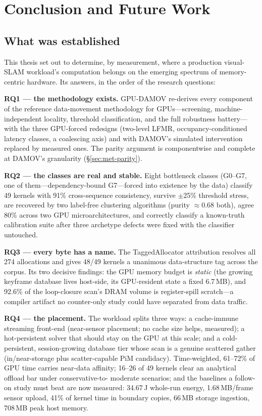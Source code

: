 \chapter{Conclusion and Future Work}
\label{ch:conclusion}

\section{What was established}

This thesis set out to determine, by measurement, where a production
visual-SLAM workload's computation belongs on the emerging spectrum of
memory-centric hardware. Its answers, in the order of the research
questions:

\textbf{RQ1 --- the methodology exists.} GPU-DAMOV re-derives every
component of the reference data-movement methodology for GPUs---screening,
machine-independent locality, threshold classification, and the full
robustness battery---with the three GPU-forced redesigns (two-level LFMR,
occupancy-conditioned latency classes, a coalescing axis) and with DAMOV's
simulated intervention replaced by measured ones. The parity argument is
componentwise and complete at DAMOV's granularity
(\S\ref{sec:met-parity}).

\textbf{RQ2 --- the classes are real and stable.} Eight bottleneck classes
(G0--G7, one of them---dependency-bound G7---forced into existence by the
data) classify 49 kernels with 91\% cross-sequence consistency, survive
$\pm$25\% threshold stress, are recovered by two label-free clustering
algorithms (purity $\approx$0.68 both), agree 80\% across two GPU
microarchitectures, and correctly classify a known-truth calibration suite
after three archetype defects were fixed with the classifier untouched.

\textbf{RQ3 --- every byte has a name.} The TaggedAllocator attribution
resolves all 274 allocations and gives 48/49 kernels a unanimous
data-structure tag across the corpus. Its two decisive findings: the GPU
memory budget is \emph{static} (the growing keyframe database lives
host-side, its GPU-resident state a fixed 6.7\,MB), and 92.6\% of the
loop-closure scan's DRAM volume is register-spill scratch---a compiler
artifact no counter-only study could have separated from data traffic.

\textbf{RQ4 --- the placement.} The workload splits three ways: a
cache-immune streaming front-end (near-sensor placement; no cache size
helps, measured); a hot-persistent solver that should stay on the GPU at
this scale; and a cold-persistent, session-growing database tier whose scan
is a genuine scattered gather (in/near-storage plus scatter-capable PiM
candidacy). Time-weighted, 61--72\% of GPU time carries near-data affinity;
16--26 of 49 kernels clear an analytical offload bar under conservative-to-
moderate scenarios; and the baselines a follow-on study must beat are now
measured: 34.67\,J whole-run energy, 1.68\,MB/frame sensor upload, 41\% of
kernel time in boundary copies, 66\,MB storage ingestion, 708\,MB peak host
memory.

